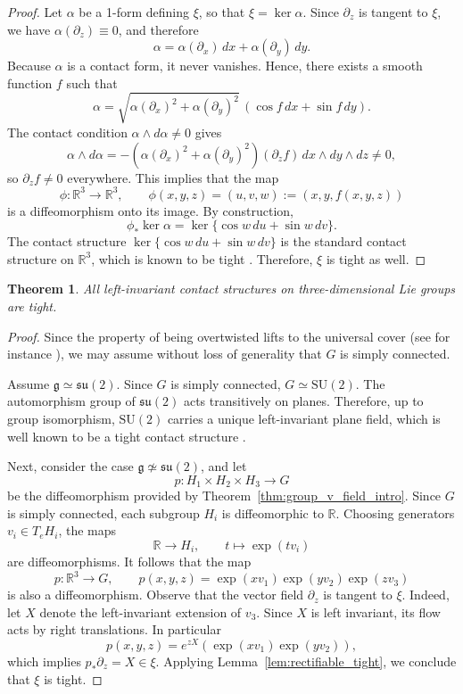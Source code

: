 \documentclass[reqno]{amsart}
\newtheorem{theorem}{Theorem}[section]
\theoremstyle{remark}
\theoremstyle{plain}
\begin{document}
\begin{proof}
	Let \(\alpha\) be a 1-form defining \(\xi\), so that \(\xi = \ker \alpha\). Since \(\partial_z\) is tangent to $\xi$, we have \(\alpha(\partial_z) \equiv 0\), and therefore
	\[
	\alpha = \alpha(\partial_x)\, dx + \alpha(\partial_y)\, dy.
	\]
	Because \(\alpha\) is a contact form, it never vanishes. Hence, there exists a smooth function \(f\) such that
	\[
	\alpha = \sqrt{\alpha(\partial_x)^2 + \alpha(\partial_y)^2} \, (\cos f \, dx + \sin f \, dy).
	\]
	The contact condition \(\alpha \wedge d\alpha \neq 0\) gives
	\[
	\alpha \wedge d\alpha = -(\alpha(\partial_x)^2 + \alpha(\partial_y)^2) (\partial_z f) \, dx \wedge dy \wedge dz \neq 0,
	\]
	so \(\partial_z f \neq 0\) everywhere. This implies that the map
	\[
	\phi: \mathbb{R}^3 \to \mathbb{R}^3, \qquad \phi(x,y,z) = (u,v,w) := (x,y,f(x,y,z))
	\]
	is a diffeomorphism onto its image. By construction,
	\[
	\phi_* \ker \alpha = \ker \{ \cos w \, du + \sin w \, dv \}.
	\]
	The contact structure \(\ker \{ \cos w \, du + \sin w \, dv \}\) is the standard contact structure on \(\mathbb{R}^3\), which is known to be tight \cite{Massot-LectureNotes}. Therefore, \(\xi\) is tight as well.
\end{proof}
\begin{theorem}
	All left-invariant contact structures on three-dimensional Lie groups are tight.
\end{theorem}
\begin{proof}
	Since the property of being overtwisted lifts to the universal cover (see for instance \cite[Remark\, 2.6]{ABBR}), we may assume without loss of generality that \(G\) is simply connected.
	
	Assume $\mathfrak g \simeq \mathfrak{su}(2)$. Since $G$ is simply connected, $G \simeq \mathrm{SU}(2)$. The automorphism group of $\mathfrak{su}(2)$ acts transitively on planes. Therefore, up to group isomorphism, $\mathrm{SU}(2)$ carries a unique left-invariant plane field, which is well known to be a tight contact structure \cite{Massot-LectureNotes}.
	
	Next, consider the case  \(\mathfrak g \not\simeq \mathfrak{su}(2)\), and let
	\[
	p: H_1 \times H_2 \times H_3 \to G
	\]
	be the diffeomorphism provided by Theorem~\ref{thm:group_v_field_intro}. Since \(G\) is simply connected, each subgroup \(H_i\) is diffeomorphic to \(\mathbb{R}\). Choosing generators \(v_i \in T_e H_i\), the maps
	\[
	\mathbb{R} \to H_i, \qquad t \mapsto \exp(t v_i)
	\]
	are diffeomorphisms. It follows that the map
	\[
	p: \mathbb{R}^3 \to G, \qquad p(x,y,z) = \exp(x v_1) \exp(y v_2) \exp(z v_3)
	\]
	is also a diffeomorphism. Observe that the vector field \(\partial_z\) is tangent to $\xi$. Indeed, let \(X\) denote the left-invariant extension of \(v_3\). Since $X$ is left invariant, its flow acts by right translations. In particular
	\[
	p(x,y,z) = e^{zX}(\exp(x v_1) \exp(y v_2)),
	\]
	which implies \(p_* \partial_z = X \in \xi\). Applying Lemma~\ref{lem:rectifiable_tight}, we conclude that \(\xi\) is tight.
\end{proof}

	
\end{document}
